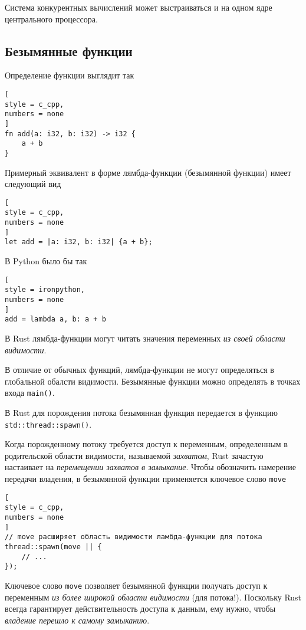 \documentclass[%
	11pt,
	a4paper,
	utf8,
		]{article}
\begin{document}
Система конкурентных вычислений может выстраиваться и на одном ядре центрального процессора.

\subsection{Безымянные функции}

Определение функции выглядит так
\begin{lstlisting}[
style = c_cpp,
numbers = none
]
fn add(a: i32, b: i32) -> i32 {
    a + b
}
\end{lstlisting}

Примерный эквивалент в форме лямбда-функции (безымянной функции) имеет следующий вид
\begin{lstlisting}[
style = c_cpp,
numbers = none
]
let add = |a: i32, b: i32| {a + b};
\end{lstlisting}

В Python было бы так
\begin{lstlisting}[
style = ironpython,
numbers = none	
]
add = lambda a, b: a + b
\end{lstlisting}

В Rust лямбда-функции могут читать значения переменных \emph{из своей области видимости}.

{\color{red} В отличие от обычных функций, лямбда-функции не могут определяться в глобальной обалсти видимости}. Безымянные функции можно определять в точках входа \verb|main()|.

В Rust для порождения потока безымянная функция передается в функцию \verb|std::thread::spawn()|.

Когда порожденному потоку требуется доступ к переменным, определенным в родительской области видимости, называемой \emph{захватом}, Rust зачастую настаивает на \emph{перемещении захватов в замыкание}. Чтобы обозначить намерение передачи владения, в безымянной функции применяется ключевое слово \verb|move|
\begin{lstlisting}[
style = c_cpp,
numbers = none
]
// move расширяет область видимости ламбда-функции для потока
thread::spawn(move || {
    // ...
});
\end{lstlisting}

{\color{blue}
Ключевое слово \verb|move| позволяет безымянной функции получать доступ к переменным \emph{из более широкой области видимости} (для потока!).
} Поскольку Rust всегда гарантирует действительность доступа к данным, ему нужно, чтобы \emph{владение перешло к самому замыканию}.
\end{document}
